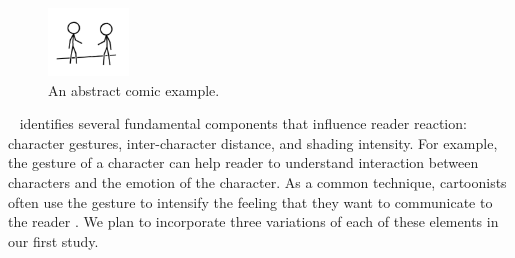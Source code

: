 


\begin{figure}
	\centering
	\includegraphics[width=0.19\textwidth]{figures/xkcd_example}
	\vspace{-10pt}
    \caption{An abstract comic example.}
    \label{fig:xkcd}
	\vspace{-10pt}
\end{figure}

~\textcite{scott1993understanding} identifies several fundamental components that influence reader reaction: character gestures, inter-character distance, and shading intensity. For example, the gesture of a character can help reader to understand interaction between characters and the emotion of the character. As a common technique, cartoonists often use the gesture to intensify the feeling that they want to communicate to the reader \cite{scott1993understanding}.
We plan to incorporate three variations of each of these elements in our first study.

